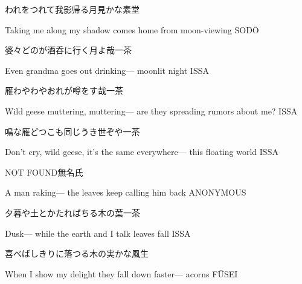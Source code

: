 \begin{haiku}
    {\FH われをつれて我影帰る月見かな}\hfill{\FH 素堂}

    \vin{} Taking me along
    \vin{} \vin{} my shadow comes home
    \vin{} \vin{} \vin{} from moon-viewing \hspace{\fill} SOD\={O}
\end{haiku}

\begin{haiku}
    {\FH 婆々どのが酒呑に行く月よ哉}\hfill{\FH 一茶}

    \vin{} Even grandma
    \vin{} \vin{} goes out drinking---
    \vin{} \vin{} \vin{} moonlit night \hspace{\fill} ISSA
\end{haiku}

\begin{haiku}
    {\FH 雁わやわやおれが噂をす哉}\hfill{\FH 一茶}

    \vin{} Wild geese muttering, muttering---
    \vin{} \vin{} are they spreading
    \vin{} \vin{} \vin{} rumors about me? \hspace{\fill} ISSA
\end{haiku}

\begin{haiku}
    {\FH 鳴な雁どつこも同じうき世ぞや}\hfill{\FH 一茶}

    \vin{} Don't cry, wild geese,
    \vin{} \vin{} it's the same everywhere---
    \vin{} \vin{} \vin{} this floating world \hspace{\fill} ISSA
\end{haiku}

\begin{haiku}
    {NOT FOUND}\hfill{\FH 無名氏}

    \vin{} A man raking---
    \vin{} \vin{} the leaves keep
    \vin{} \vin{} \vin{} calling him back \hspace{\fill} ANONYMOUS
\end{haiku}

\begin{haiku}
    {\FH 夕暮や土とかたればちる木の葉}\hfill{\FH 一茶}

    \vin{} Dusk---
    \vin{} \vin{} while the earth and I talk
    \vin{} \vin{} \vin{} leaves fall \hspace{\fill} ISSA
\end{haiku}

\begin{haiku}
    {\FH 喜べばしきりに落つる木の実かな}\hfill{\FH 風生}

    \vin{} When I show my delight
    \vin{} \vin{} they fall down faster---
    \vin{} \vin{} \vin{} acorns \hspace{\fill} F\={U}SEI
\end{haiku}

